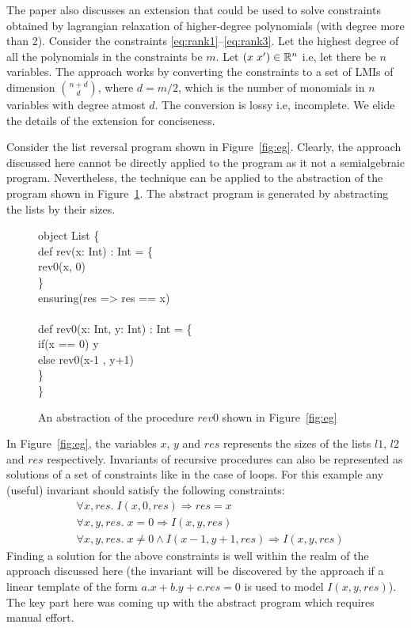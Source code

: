 The paper also discusses an extension that could be used to solve constraints obtained by lagrangian relaxation of higher-degree polynomials (with degree more than 2). Consider the constraints \ref{eq:rank1}--\ref{eq:rank3}. Let the highest degree of all the polynomials in the constraints be $m$. Let $(x \; x') \in \mathbb{R}^n$ i.e, let there be $n$ variables. The approach works by converting the constraints to a set of LMIs of dimension ${ n+ d \choose d}$, where $d = m/2$, which is the number of monomials in $n$ variables with degree atmost $d$. The conversion is lossy i.e, incomplete. We elide the details of the extension for conciseness.

Consider the list reversal program shown in Figure~\ref{fig:eg}. Clearly, the approach discussed here cannot be directly applied to the program as it not a semialgebraic program. Nevertheless, the technique can be applied to the abstraction of the program shown in Figure~\ref{fig:absRev}. The abstract program is generated
by abstracting the lists by their sizes. 
%
\begin{figure}
\begin{myprogram}
object List \{ \\
\pnl \>    def rev(x: Int) : Int = \{ \\
\pnl \> \>      rev0(x, 0)  \\
\pnl \>    \} \\
\pnl \>    ensuring(res => res == x)\\
\\    
\pnl \>    def rev0(x: Int, y: Int) : Int = \{ \\
\pnl \> \>      if(x == 0) y  \\
\pnl \> \>      else rev0(x-1 , y+1) \\
\pnl \>    \} \\ 
\}
\end{myprogram}
\caption{An abstraction of the procedure $rev0$ shown in Figure~\ref{fig:eg}} \label{fig:absRev}
\end{figure}
%
In Figure~\ref{fig:eg}, the variables $x$, $y$ and $res$ represents the 
sizes of the lists $l1$, $l2$ and $res$ respectively.
Invariants of recursive procedures can also be represented as solutions 
of a set of constraints like in the case of loops.
For this example any (useful) invariant should satisfy the following constraints:
%
\begin{align}
& \forall x,res. \; I(x,0,res) \Rightarrow res = x \\
& \forall x,y,res. \; x = 0 \Rightarrow I(x,y,res) \\
& \forall x,y,res. \; x \ne 0 \wedge I(x-1,y+1,res) \Rightarrow I(x,y,res)
\end{align}
%
Finding a solution for the above constraints is well within the realm of the approach discussed here (the invariant will be discovered by the approach if a linear template of the form $a.x+b.y+c.res = 0$ is used to model $I(x,y,res)$). The key part here was coming up with the abstract program which requires manual effort.


